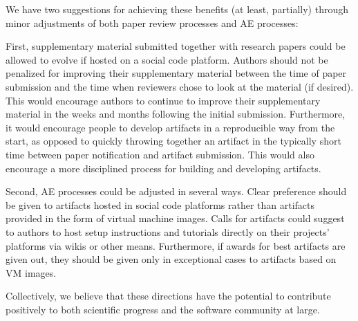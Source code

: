 \documentclass[acmtocl]{acmtrans2m}
\begin{document}
We have two suggestions for achieving these benefits (at least, partially)
through minor adjustments of both paper review processes and AE processes:

First, supplementary material submitted together with research papers could be
allowed to evolve if hosted on a social code platform. Authors should not be
penalized for improving their supplementary material between the time of paper
submission and the time when reviewers chose to look at the material (if
desired). This would encourage authors to continue to improve their
supplementary material in the weeks and months following the initial
submission. Furthermore, it would encourage people to develop artifacts in a
reproducible way from the start, as opposed to quickly throwing together an
artifact in the typically short time between paper notification and artifact
submission. This would also encourage a more disciplined process for building
and developing artifacts.

Second, AE processes could be adjusted in several ways. Clear preference
should be given to artifacts hosted in social code platforms rather than
artifacts provided in the form of virtual machine images. Calls for artifacts
could suggest to authors to host setup instructions and tutorials directly on
their projects' platforms via wikis or other means. Furthermore, if awards for
best artifacts are given out, they should be given only in exceptional cases
to artifacts based on VM images.

Collectively, we believe that these directions have the potential to
contribute positively to both scientific progress and the software community
at large.




\end{document}
